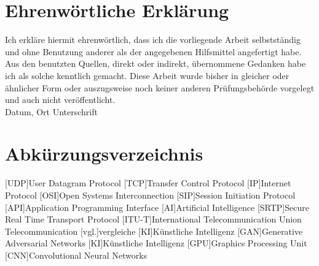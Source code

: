 \documentclass[12pt,a4paper]{article}
\begin{document}
\newpage
\section*{Ehrenwörtliche Erklärung}
	Ich erkläre hiermit ehrenwörtlich, dass ich die vorliegende Arbeit selbstständig und ohne Benutzung anderer als der angegebenen Hilfsmittel angefertigt habe. Aus den benutzten Quellen, direkt oder indirekt, übernommene Gedanken habe ich als solche kenntlich gemacht. Diese Arbeit wurde bisher in gleicher oder ähnlicher Form oder auszugsweise noch keiner anderen Prüfungsbehörde vorgelegt und auch nicht veröffentlicht.
	\vspace{1cm}
	\newline
	\noindent {} \hfill {}\\
	{\noindent \small Datum, Ort \hfill Unterschrift}

\newpage
\tableofcontents

\newpage
\pagestyle{fancy}
\section*{Abkürzungsverzeichnis}
\begin{acronym}
	[UDP]{User Datagram Protocol}
	[TCP]{Transfer Control Protocol}
	[IP]{Internet Protocol}
	[OSI]{Open Systems Interconnection}
	[SIP]{Session Initiation Protocol}
	[API]{Application Programming Interface}
	[AI]{Artificial Intelligence}
	[SRTP]{Secure Real Time Transport Protocol}
	[ITU-T]{International Telecommunication Union Telecommunication}
	[vgl.]{vergleiche}
	[KI]{Künstliche Intelligenz}
	[GAN]{Generative Adversarial Networks}
	[KI]{Künstliche Intelligenz}
	[GPU]{Graphics Processing Unit}
	[CNN]{Convolutional Neural Networks}
\end{acronym}
\end{document}
